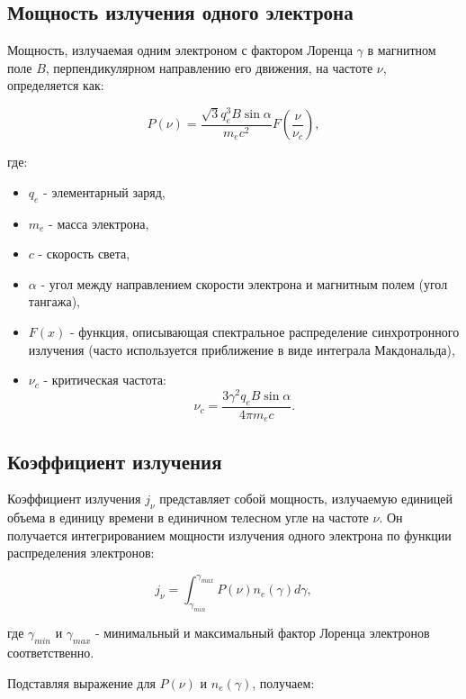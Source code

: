 \documentclass[a4paper,12pt]{extarticle}
\begin{document}
\subsection{Мощность излучения одного электрона}

Мощность, излучаемая одним электроном с фактором Лоренца $\gamma$ в магнитном поле $B$, перпендикулярном направлению его движения, на частоте $\nu$, определяется как:

\begin{equation}
    P(\nu) = \frac{\sqrt{3} q_e^3 B \sin{\alpha}}{m_e c^2} F\left(\frac{\nu}{\nu_c}\right),
\end{equation}

где:
\begin{itemize}
    \item $q_e$ - элементарный заряд,
    \item $m_e$ - масса электрона,
    \item $c$ - скорость света,
    \item $\alpha$ - угол между направлением скорости электрона и магнитным полем (угол тангажа),
    \item $F(x)$ - функция, описывающая спектральное распределение синхротронного излучения (часто используется приближение в виде интеграла Макдональда),
    \item $\nu_c$ - критическая частота:
    \begin{equation}
        \nu_c = \frac{3 \gamma^2 q_e B \sin{\alpha}}{4 \pi m_e c}.
    \end{equation}
\end{itemize}

\subsection{Коэффициент излучения}

Коэффициент излучения $j_\nu$ представляет собой мощность, излучаемую единицей объема в единицу времени в единичном телесном угле на частоте $\nu$. Он получается интегрированием мощности излучения одного электрона по функции распределения электронов:

\begin{equation}
    j_\nu = \int_{\gamma_{min}}^{\gamma_{max}} P(\nu) n_e(\gamma) d\gamma,
\end{equation}

где $\gamma_{min}$ и $\gamma_{max}$ - минимальный и максимальный фактор Лоренца электронов соответственно.

Подставляя выражение для $P(\nu)$ и $n_e(\gamma)$, получаем:
\end{document}
